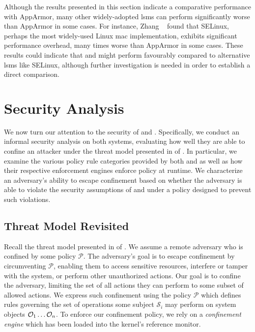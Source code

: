 Although the results presented in this section indicate a comparative performance with
AppArmor, many other widely-adopted \glspl{lsm} can perform significantly worse than
AppArmor in some cases. For instance, Zhang \etal~\cite{zhang2021_lsm_file_overhead} found
that SELinux, perhaps the most widely-used Linux \gls{mac} implementation, exhibits
significant performance overhead, many times worse than AppArmor in some cases. These
results could indicate that \bpfbox{} and \bpfcontain{} might perform favourably compared
to alternative \glspl{lsm} like SELinux, although further investigation is needed in order
to establish a direct comparison.

\section{Security Analysis}%
\label{s:eval-security}

We now turn our attention to the security of \bpfbox{} and \bpfcontain. Specifically, we
conduct an informal security analysis on both systems, evaluating how well they are able
to confine an attacker under the threat model presented in  of
. In particular, we examine the various policy rule categories
provided by both \bpfbox{} and \bpfcontain{} as well as how their respective enforcement
engines enforce policy at runtime. We characterize an adversary's ability to escape
confinement based on whether the adversary is able to violate the security assumptions of
\bpfbox{} and \bpfcontain{} under a policy designed to prevent such violations.


\subsection{Threat Model Revisited}

Recall the threat model presented in  of
. We assume a remote adversary who is confined by some policy
$\mathcal{P}$. The adversary's goal is to escape confinement by circumventing
$\mathcal{P}$, enabling them to access sensitive resources, interfere or tamper with the
system, or perform other unauthorized actions. Our goal is to confine the adversary,
limiting the set of all actions they can perform to some subset of allowed actions. We
express such confinement using the policy $\mathcal{P}$ which defines rules governing the
set of operations some subject $\mathcal{S}_i$ may perform on system objects
$\mathcal{O}_1 \mathellipsis \mathcal{O}_n$. To enforce our confinement policy, we rely on
a \textit{confinement engine} which has been loaded into the kernel's reference monitor.

